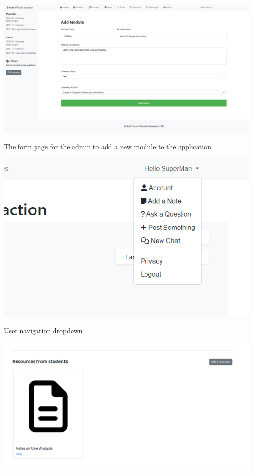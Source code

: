 \includegraphics[scale=0.20]{images/application/51 - admin_add_module.png}

The form page for the admin to add a new module to the application

\includegraphics[scale=0.50]{images/application/55 - nav_user_dropdwon.png}

User navigation dropdown

\includegraphics[scale=0.27]{images/application/56 - student_resource.png}

